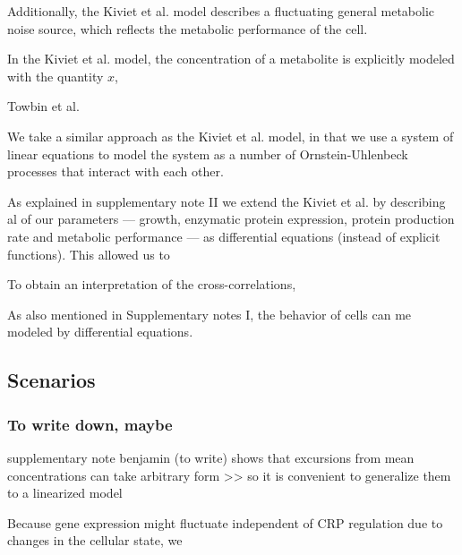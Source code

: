 Additionally, the Kiviet et al. model describes a fluctuating general metabolic noise source, which reflects the metabolic performance of the cell.
%


In the Kiviet et al. model, the concentration of a metabolite is explicitly modeled with the quantity $x$, 

Towbin et al.



We take a similar approach as the Kiviet et al. model, in that we use a system of linear equations to model the system as a number of Ornstein-Uhlenbeck processes that interact with each other.
%

%
As explained in supplementary note II we extend the Kiviet et al. by describing al of our parameters --- growth, enzymatic protein expression, protein production rate and metabolic performance --- as differential equations (instead of explicit functions).
%
This allowed us to 







To obtain an interpretation of the cross-correlations, 

As also mentioned in Supplementary notes I, the behavior of cells can me modeled by differential equations.
%



\subsection{Scenarios}


\subsubsection*{To write down, maybe}


supplementary note benjamin (to write) shows that excursions from mean concentrations can take arbitrary form
>> so it is convenient to generalize them to a linearized model



















% 
Because gene expression might fluctuate independent of CRP regulation due to changes in the cellular state,
we 

